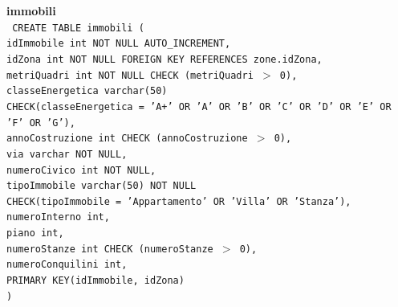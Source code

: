 \documentclass[a4paper,12pt]{report}
\begin{document}
                \noindent
                {\large \textbf{immobili}} \\
                \texttt{
                    CREATE TABLE immobili ( \\
                    \null\quad\quad idImmobile           int NOT NULL AUTO\_INCREMENT, \\
                    \null\quad\quad idZona               int NOT NULL               FOREIGN KEY REFERENCES zone.idZona, \\
                    \null\quad\quad metriQuadri          int NOT NULL               CHECK (metriQuadri $>$ 0), \\
                    \null\quad\quad classeEnergetica     varchar(50) \\
                            \null\qquad\qquad CHECK(classeEnergetica = 'A+' OR 'A' OR 'B' OR 'C' OR 'D' OR 'E' OR \\
                            \null\qquad\qquad 'F' OR 'G'), \\
                    \null\quad\quad annoCostruzione      int                    CHECK (annoCostruzione $>$ 0), \\
                    \null\quad\quad via                  varchar                NOT NULL, \\
                    \null\quad\quad numeroCivico         int                    NOT NULL, \\
                    \null\quad\quad tipoImmobile         varchar(50)         NOT NULL \\
                            \null\qquad\qquad CHECK(tipoImmobile = 'Appartamento' OR 'Villa' OR 'Stanza'), \\
                    \null\quad\quad numeroInterno        int, \\
                    \null\quad\quad piano                int, \\
                    \null\quad\quad numeroStanze         int                    CHECK (numeroStanze $>$ 0), \\
                    \null\quad\quad numeroConquilini     int, \\
                    \null\quad\quad PRIMARY KEY(idImmobile, idZona) \\
                    )
                } \\
\end{document}

